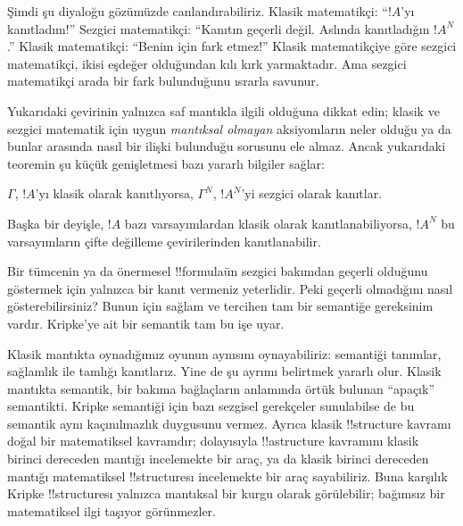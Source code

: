 \documentclass[../../../include/open-logic-section]{subfiles}
\begin{document}
Şimdi şu diyaloğu gözümüzde canlandırabiliriz. Klasik matematikçi: ``$!A$'yı
kanıtladım!'' Sezgici matematikçi: ``Kanıtın geçerli değil. Aslında kanıtladığın
$!A^N$.'' Klasik matematikçi: ``Benim için fark etmez!'' Klasik matematikçiye
göre sezgici matematikçi, ikisi eşdeğer olduğundan kılı kırk yarmaktadır. Ama
sezgici matematikçi arada bir fark bulunduğunu ısrarla savunur.

Yukarıdaki çevirinin yalnızca saf mantıkla ilgili olduğuna dikkat edin; klasik
ve sezgici matematik için uygun \emph{mantıksal olmayan} aksiyomların neler
olduğu ya da bunlar arasında nasıl bir ilişki bulunduğu sorusunu ele almaz.
Ancak yukarıdaki teoremin şu küçük genişletmesi bazı yararlı bilgiler sağlar:

\begin{thm}
$\Gamma$, $!A$'yı klasik olarak kanıtlıyorsa, $\Gamma^N$, $!A^N$'yi sezgici
olarak kanıtlar.
\end{thm}

Başka bir deyişle, $!A$ bazı varsayımlardan klasik olarak kanıtlanabiliyorsa,
$!A^N$ bu varsayımların çifte değilleme çevirilerinden kanıtlanabilir.

Bir tümcenin ya da önermesel !!{formula}{}ün sezgici bakımdan geçerli olduğunu
göstermek için yalnızca bir kanıt vermeniz yeterlidir. Peki geçerli
olmadığını nasıl gösterebilirsiniz? Bunun için sağlam ve tercihen tam
bir semantiğe gereksinim vardır. Kripke'ye ait bir semantik tam bu işe uyar.

Klasik mantıkta oynadığımız oyunun aynısını oynayabiliriz: semantiği tanımlar,
sağlamlık ile tamlığı kanıtlarız. Yine de şu ayrımı belirtmek yararlı olur.
Klasik mantıkta semantik, bir bakıma bağlaçların anlamında örtük bulunan
``apaçık'' semantikti. Kripke semantiği için bazı sezgisel gerekçeler
sunulabilse de bu semantik aynı kaçınılmazlık duygusunu vermez. Ayrıca klasik
!!{structure} kavramı doğal bir matematiksel kavramdır; dolayısıyla
!!a{structure} kavramını klasik birinci dereceden mantığı incelemekte bir araç,
ya da klasik birinci dereceden mantığı matematiksel !!{structure}{}sı incelemekte
bir araç sayabiliriz. Buna karşılık Kripke !!{structure}{}sı yalnızca mantıksal
bir kurgu olarak görülebilir; bağımsız bir matematiksel ilgi taşıyor
görünmezler.
\end{document}
